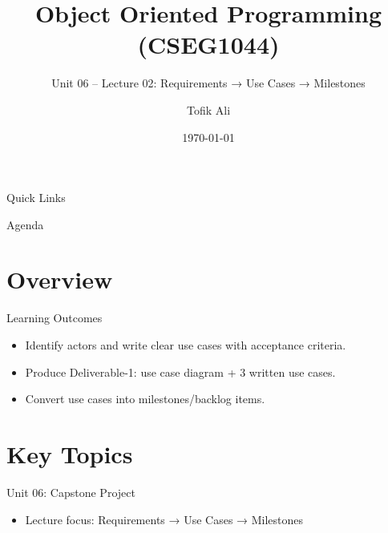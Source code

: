 \documentclass{beamer}
\title[OOPS with Java]{Object Oriented Programming (CSEG1044)}
\subtitle{Unit 06 -- Lecture 02: Requirements → Use Cases → Milestones}
\author{Tofik Ali}
\institute{School of Computer Science, UPES Dehradun}
\date{\today}
\begin{document}
\begin{frame}[fragile]
  \titlepage
  \vspace{0.5em}
  \slidesources{\OOPSUnitVISources}
\end{frame}

\begin{frame}{Quick Links}
  \centering
  \hyperlink{sec:overview}{}\hspace{0.6em}
  \hyperlink{sec:concepts}{}\hspace{0.6em}
  \hyperlink{sec:demo}{}\hspace{0.6em}
  \hyperlink{sec:summary}{}
  \slidesources{\OOPSUnitVISources}
\end{frame}

\begin{frame}{Agenda}
  \tableofcontents
  \slidesources{\OOPSUnitVISources}
\end{frame}

\section{Overview}
\label{sec:overview}

\begin{frame}{Learning Outcomes}
  \begin{itemize}[<+->]
    \item Identify actors and write clear use cases with acceptance criteria.
    \item Produce Deliverable-1: use case diagram + 3 written use cases.
    \item Convert use cases into milestones/backlog items.
  \end{itemize}
  \slidesources{\OOPSUnitVISources}
\end{frame}

\section{Key Topics}
\label{sec:concepts}

\begin{frame}{Unit 06: Capstone Project}
  \begin{itemize}[<+->]
    \item Lecture focus: Requirements → Use Cases → Milestones
  \end{itemize}
  \slidesources{\OOPSUnitVISources}
\end{frame}
\end{document}
